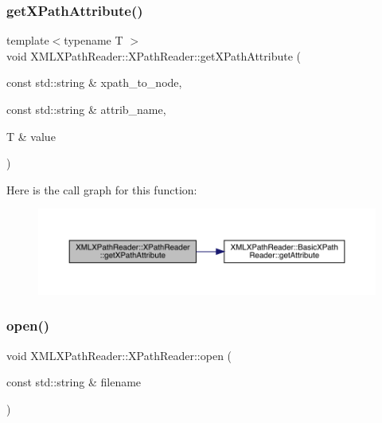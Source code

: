 \subsubsection{\texorpdfstring{getXPathAttribute()}{getXPathAttribute()}\hspace{0.1cm}{\footnotesize\ttfamily [2/2]}}
{\footnotesize\ttfamily template$<$typename T $>$ \\
void X\+M\+L\+X\+Path\+Reader\+::\+X\+Path\+Reader\+::get\+X\+Path\+Attribute (\begin{DoxyParamCaption}\item[{const std\+::string \&}]{xpath\+\_\+to\+\_\+node,  }\item[{const std\+::string \&}]{attrib\+\_\+name,  }\item[{T \&}]{value }\end{DoxyParamCaption})\hspace{0.3cm}{\ttfamily [inline]}}

Here is the call graph for this function\+:
\nopagebreak
\begin{figure}[H]
\begin{center}
\leavevmode
\includegraphics[width=350pt]{d3/d5a/classXMLXPathReader_1_1XPathReader_a0a5ca67826c2c8fdad784a3bbbba4b3c_cgraph}
\end{center}
\end{figure}
\mbox{\label{classXMLXPathReader_1_1XPathReader_aa6e237582bcd20389d60cb29a879890c}} 
\subsubsection{\texorpdfstring{open()}{open()}\hspace{0.1cm}{\footnotesize\ttfamily [1/6]}}
{\footnotesize\ttfamily void X\+M\+L\+X\+Path\+Reader\+::\+X\+Path\+Reader\+::open (\begin{DoxyParamCaption}\item[{const std\+::string \&}]{filename }\end{DoxyParamCaption})\hspace{0.3cm}{\ttfamily [inline]}}

